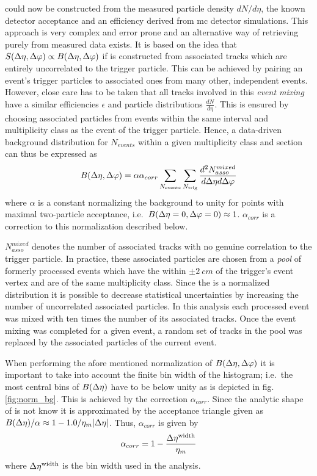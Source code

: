 \B could now be constructed from the measured particle density $dN/d\eta$, the known detector acceptance and an efficiency derived from \gls{mc} detector simulations. This approach is very complex and error prone and an alternative way of retrieving \B purely from measured data exists. It is based on the idea that $S(\Delta\eta, \Delta\varphi) \propto B(\Delta\eta, \Delta\varphi)$ if \Sig is constructed from associated tracks which are entirely uncorrelated to the trigger particle. This can be achieved by pairing an event's trigger particles to associated ones from many other, independent events. However, close care has to be taken that all tracks involved in this \emph{event mixing} have a similar efficiencies $\epsilon$ and particle distributions $\frac{dN}{d\eta}$. This is ensured by choosing associated particles from events within the same \zvtx interval and multiplicity class as the event of the trigger particle.
Hence, a data-driven background distribution for $N_{events}$ within a given multiplicity class and \zvtx section can thus be expressed as
\begin{equation}
  \label{eq:background_datadriven}
  B(\Delta\eta, \Delta\varphi) = \alpha \alpha_{corr}
  \sum_{N_{\text{events}}} 
  \sum_{N_{\text{trig}}}
  \frac{d^2N_{asso}^{mixed}}{d\Delta\eta d\Delta\varphi}
\end{equation}
where $\alpha$ is a constant normalizing the background to unity for points with maximal two-particle acceptance, i.e.\  $B(\Delta\eta = 0, \Delta\varphi=0) \approx 1$. $\alpha_{corr}$ is a correction to this normalization described below.

$N_{asso}^{mixed}$ denotes the number of associated tracks with no genuine correlation to the trigger particle. In practice, these associated particles are chosen from a \emph{pool} of formerly processed events which have the \zvtx within $\pm \SI{2}{cm}$ of the trigger's event vertex and are of the same multiplicity class. Since the \B is a normalized distribution it is possible to decrease statistical uncertainties by increasing the number of uncorrelated associated particles. In this analysis each processed event was mixed with ten times the number of its associated tracks. Once the event mixing was completed for a given event, a random set of tracks in the pool was replaced by the associated particles of the current event.

When performing the afore mentioned normalization of  $B(\Delta\eta, \Delta\varphi)$ it is important to take into account the finite bin width of the histogram; i.e.\ the most central bins of $B(\Delta\eta)$ have to be below unity as is depicted in fig. \ref{fig:norm_bg}. This is achieved by the correction $\alpha_{corr}$. Since the analytic shape of \B is not know it is approximated by the acceptance triangle given as $B(\Delta\eta) / \alpha \approx 1-1.0/\eta_m|\Delta\eta|$. Thus, $\alpha_{corr}$ is given by
\begin{equation}
  \label{eq:alpha}
  \alpha_{corr} = 1- \frac{\Delta\eta^{\text{width}}}{\eta_m}
\end{equation}
where $\Delta\eta^{\text{width}}$ is the \deta bin width used in the analysis.

